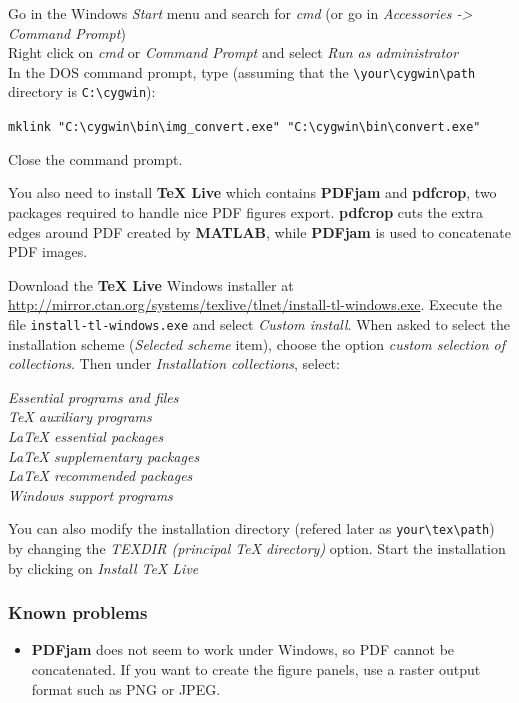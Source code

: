 \documentclass[twoside,a4paper]{article}
\def\PDFjam{\textbf{PDFjam}}
\def\pdfcrop{\textbf{pdfcrop}}
\def\MATLAB{\textbf{MATLAB}}
\begin{document}
Go in the Windows \textit{Start} menu and search for \textit{cmd} (or go in \textit{Accessories -> Command Prompt})\\
Right click on \textit{cmd} or \textit{Command Prompt} and select \textit{Run as administrator}\\
In the DOS command prompt, type (assuming that the \verb|\your\cygwin\path| directory is \verb|C:\cygwin|):

\verb|mklink "C:\cygwin\bin\img_convert.exe" "C:\cygwin\bin\convert.exe"|

Close the command prompt.

You also need to install \textbf{TeX Live} which contains {\PDFjam} and {\pdfcrop}, two packages required to handle nice PDF figures export. {\pdfcrop} cuts the extra edges around PDF created by {\MATLAB}, while {\PDFjam} is used to concatenate PDF images.

Download the \textbf{TeX Live} Windows installer at \url{http://mirror.ctan.org/systems/texlive/tlnet/install-tl-windows.exe}. Execute the file \verb|install-tl-windows.exe| and select \textit{Custom install}. When asked to select the installation scheme (\textit{Selected scheme} item), choose the option \textit{custom selection of collections}. Then under \textit{Installation collections}, select:

\textit{Essential programs and files}\\
\textit{TeX auxiliary programs}\\
\textit{LaTeX essential packages}\\
\textit{LaTeX supplementary packages}\\
\textit{LaTeX recommended packages}\\
\textit{Windows support programs}

You can also modify the installation directory (refered later as \verb|your\tex\path|) by changing the \textit{TEXDIR (principal TeX directory)} option. Start the installation by clicking on \textit{Install TeX Live}

\subsubsection{Known problems}
\begin{itemize}
\setlength\itemsep{2ex}
\setlength{\parindent}{5ex}
\item {\PDFjam} does not seem to work under Windows, so PDF cannot be concatenated. If you want to create the figure panels, use a raster output format such as PNG or JPEG.

\end{itemize}
\end{document}
